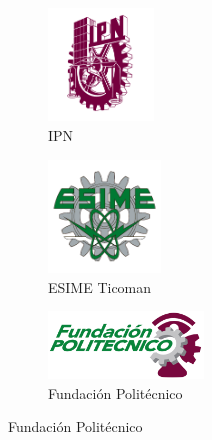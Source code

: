 \documentclass[letterpaper,12pt]{article} %
\begin{document}
    \begin{figure}[h!]
    \centering
    \begin{subfigure}[b]{0.3\textwidth}
        \centering
        \includegraphics[height=3cm]{IPN.png}
        \caption{IPN}
        \label{fig:IPN}
    \end{subfigure}
    \hfill
    \begin{subfigure}[b]{0.3\textwidth}
        \centering
        \includegraphics[height=3cm]{ESIME.png}
        \caption{ESIME Ticoman}
        \label{fig:ESIME}
    \end{subfigure}
    \hfill
    \begin{subfigure}[b]{0.3\textwidth}
        \centering
        \includegraphics[height=1.8cm]{FUNDPOL.png}
        \vspace{0.5cm}
        \caption{Fundación Politécnico}
        \label{fig:FUNDPOL}
    \end{subfigure}
    \end{figure}
\end{document}
